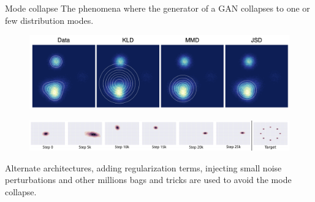 \begin{frame}{Mode collapse}
	The phenomena where the generator of a GAN collapses to one or few distribution modes.
	\begin{figure}
		\centering
		\includegraphics[width=0.9\linewidth]{figs/mode_collapse_1}
	\end{figure}
	\vspace{-0.2cm}
	\begin{figure}
		\centering
		\includegraphics[width=1.0\linewidth]{figs/mode_collapse_3}
	\end{figure}
	Alternate architectures, adding regularization terms, injecting small noise
	perturbations and other millions bags and tricks are used to avoid the mode collapse.
	
\end{frame}
